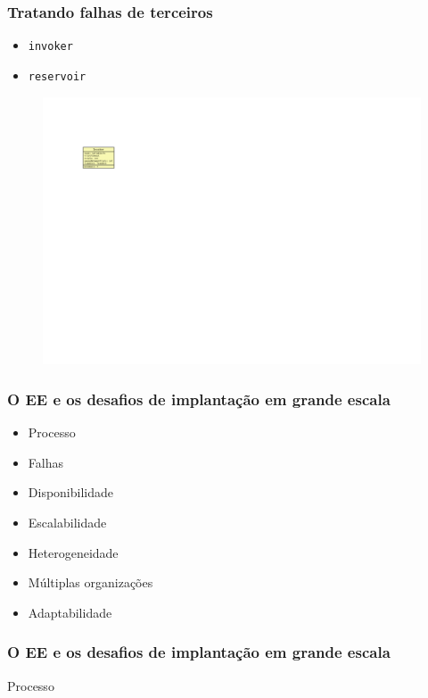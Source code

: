 \documentclass{beamer}
\begin{document}

\begin{frame}
\frametitle{Tratando falhas de terceiros}

\begin{itemize}
\item \texttt{invoker}
\item \texttt{reservoir}
\end{itemize}

\begin{figure}
\includegraphics[width=0.4\linewidth]{img/invoker}
\end{figure}

\end{frame}



\begin{frame}
\frametitle{O EE e os desafios de implantação em grande escala}

\begin{itemize}
\item Processo
\item Falhas
\item Disponibilidade
\item Escalabilidade
\item Heterogeneidade
\item Múltiplas organizações
\item Adaptabilidade
\end{itemize}

\end{frame}



\begin{frame}
\frametitle{O EE e os desafios de implantação em grande escala}

Processo

\end{frame}


\end{document}
